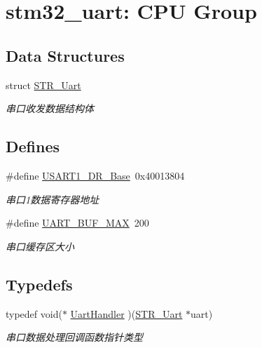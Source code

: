 \hypertarget{group___u_a_r_t}{\section{stm32\-\_\-uart\-: \-C\-P\-U \-Group}
\label{group___u_a_r_t}
}
\subsection*{\-Data \-Structures}
\begin{DoxyCompactItemize}
\item 
struct \hyperlink{struct_s_t_r___uart}{\-S\-T\-R\-\_\-\-Uart}
\begin{DoxyCompactList}\small\item\em 串口收发数据结构体 \end{DoxyCompactList}\end{DoxyCompactItemize}
\subsection*{\-Defines}
\begin{DoxyCompactItemize}
\item 
\hypertarget{group___u_a_r_t_gaa3d5bffde9e408292f931efff3860213}{\#define \hyperlink{group___u_a_r_t_gaa3d5bffde9e408292f931efff3860213}{\-U\-S\-A\-R\-T1\-\_\-\-D\-R\-\_\-\-Base}~0x40013804}\label{group___u_a_r_t_gaa3d5bffde9e408292f931efff3860213}

\begin{DoxyCompactList}\small\item\em 串口1数据寄存器地址 \end{DoxyCompactList}\item 
\hypertarget{group___u_a_r_t_ga24372e8f343b57a91bf48cdd2fd4a5dd}{\#define \hyperlink{group___u_a_r_t_ga24372e8f343b57a91bf48cdd2fd4a5dd}{\-U\-A\-R\-T\-\_\-\-B\-U\-F\-\_\-\-M\-A\-X}~200}\label{group___u_a_r_t_ga24372e8f343b57a91bf48cdd2fd4a5dd}

\begin{DoxyCompactList}\small\item\em 串口缓存区大小 \end{DoxyCompactList}\end{DoxyCompactItemize}
\subsection*{\-Typedefs}
\begin{DoxyCompactItemize}
\item 
\hypertarget{group___u_a_r_t_gacf0df3a8e9e8a2adfd954a81e7a894ec}{typedef void($\ast$ \hyperlink{group___u_a_r_t_gacf0df3a8e9e8a2adfd954a81e7a894ec}{\-Uart\-Handler} )(\hyperlink{struct_s_t_r___uart}{\-S\-T\-R\-\_\-\-Uart} $\ast$uart)}\label{group___u_a_r_t_gacf0df3a8e9e8a2adfd954a81e7a894ec}

\begin{DoxyCompactList}\small\item\em 串口数据处理回调函数指针类型 \end{DoxyCompactList}\end{DoxyCompactItemize}
